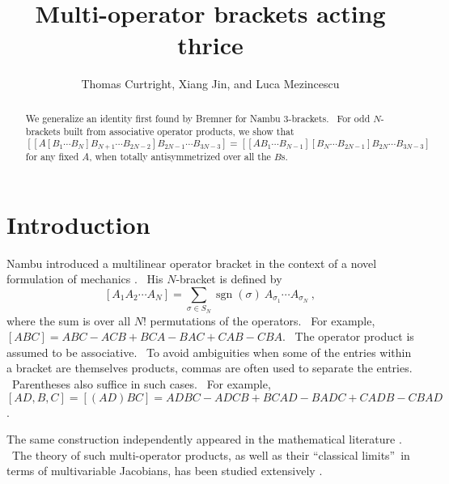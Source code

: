\documentclass[aps,preprint,tightenlines,unsortedaddress,11pt]{revtex4}\usepackage{amsfonts}
\begin{document}
\title[GBI]{Multi-operator brackets acting thrice}
\author{Thomas Curtright, Xiang Jin, and Luca Mezincescu}

\begin{abstract}
\medskip

We generalize an identity first found by Bremner for Nambu 3-brackets. \ For
odd $N$-brackets built from associative operator products, we show that
\[
\left[  \left[  A\left[  B_{1}\cdots B_{N}\right]  B_{N+1}\cdots
B_{2N-2}\right]  B_{2N-1}\cdots B_{3N-3}\right]  =\left[  \left[  AB_{1}\cdots
B_{N-1}\right]  \left[  B_{N}\cdots B_{2N-1}\right]  B_{2N}\cdots
B_{3N-3}\right]
\]
for any fixed $A$, when totally antisymmetrized over all the $B$s.

\end{abstract}
\endpage{ }
\maketitle


\section{Introduction}

Nambu introduced a multilinear operator bracket in the context of a novel
formulation of mechanics \cite{Nambu}. \ His $N$-bracket is defined by
\begin{equation}
\left[  A_{1}A_{2}\cdots A_{N}\right]  =\sum_{\sigma\in S_{N}}\operatorname*{sgn}\left(  \sigma\right)  ~A_{\sigma_{1}}\cdots A_{\sigma_{N}}\ ,
\end{equation}
where the sum is over all $N!$ permutations of the operators. \ For example,
$\left[  ABC\right]  =ABC-ACB+BCA-BAC+CAB-CBA$. \ The operator product is
assumed to be associative. \ To avoid ambiguities when some of the entries
within a bracket are themselves products, commas are often used to separate
the entries. \ Parentheses also suffice in such cases. \ For example, $\left[
AD,B,C\right]  =\left[  \left(  AD\right)  BC\right]
=ADBC-ADCB+BCAD-BADC+CADB-CBAD$.

The same construction independently appeared in the mathematical literature
\cite{Higgins,Kurosh}. \ The theory of such multi-operator products, as well
as their \textquotedblleft classical limits\textquotedblright\ in terms of
multivariable Jacobians, has been studied extensively
\cite{Bremner,CFJMZ,Curtright,deAzcarraga,Dito,Filippov,Gautheron,Hanlon,Lada,Pojidaev,Schlesinger,Takhtajan,Vainerman,Vaisman}. \ 
\end{document}
